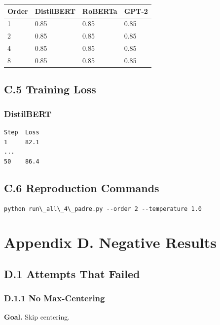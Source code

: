 \begin{table}[H]
\centering
\small
\begin{tabular}{llll}
\toprule
\textbf{Order} & \textbf{DistilBERT} & \textbf{RoBERTa} & \textbf{GPT-2} \\
\midrule
1 & 0.85 & 0.85 & 0.85 \\
2 & 0.85 & 0.85 & 0.85 \\
4 & 0.85 & 0.85 & 0.85 \\
8 & 0.85 & 0.85 & 0.85 \\
\bottomrule
\end{tabular}
\end{table}

\subsection{C.5 Training Loss}

\subsubsection{DistilBERT}
\begin{lstlisting}
Step  Loss
1     82.1
...
50    86.4
\end{lstlisting}

\subsection{C.6 Reproduction Commands}

\begin{lstlisting}
python run\_all\_4\_padre.py --order 2 --temperature 1.0
\end{lstlisting}



\section{Appendix D. Negative Results}

\subsection{D.1 Attempts That Failed}

\subsubsection{D.1.1 No Max-Centering}

\textbf{Goal.} Skip centering.

